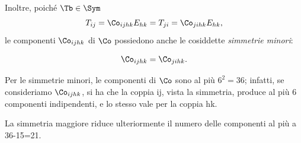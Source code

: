 Inoltre, poiché $\Tb\in\Sym$
\begin{equation}
	T_{ij}=\Co_{ijhk}E_{hk}=T_{ji}=\Co_{jihk}E_{hk},
\end{equation}
 le componenti $\Co_{ijhk}$ di $\Co$ possiedono anche  le cosiddette \textit{simmetrie minori}:

\begin{definition}
\begin{equation}
		\Co_{ijhk}=\Co_{jihk}.
\end{equation}
\end{definition}

Per le simmetrie minori, le componenti di $\Co$ sono al più $6^2=36$; infatti, se consideriamo $\Co_{ijhk}$, si ha che la coppia ij, vista la simmetria, produce al più 6 componenti indipendenti, e lo stesso vale per la coppia hk.

La simmetria maggiore riduce ulteriormente il numero delle componenti al più a 36-15=21.

